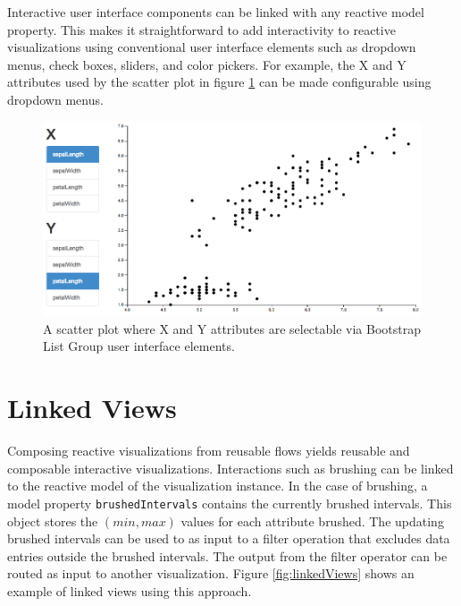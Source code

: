Interactive user interface components can be linked with any reactive model property. This makes it straightforward to add interactivity to reactive visualizations using conventional user interface elements such as dropdown menus, check boxes, sliders, and color pickers. For example, the X and Y attributes used by the scatter plot in figure \ref{fig:configurableScatter} can be made configurable using dropdown menus.

\begin{figure}
  \centering
  \includegraphics[width=\figureWidth]{figs/configurableScatter.png}
  \caption [Configurable Scatter Plot]{A scatter plot where X and Y attributes are selectable via Bootstrap List Group user interface elements.}
  \label{fig:configurableScatter}
\end{figure}


\section{Linked Views}

Composing reactive visualizations from reusable flows yields reusable and composable interactive visualizations. Interactions such as brushing can be linked to the reactive model of the visualization instance. In the case of brushing, a model property \verb`brushedIntervals` contains the currently brushed intervals. This object stores the $(min, max)$ values for each attribute brushed. The updating brushed intervals can be used to as input to a filter operation that excludes data entries outside the brushed intervals. The output from the filter operator can be routed as input to another visualization. Figure \ref{fig:linkedViews} shows an example of linked views using this approach.

